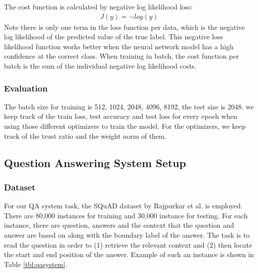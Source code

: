 The cost function is calculated by negative log likelihood loss:
\begin{align*}
    J(y) = -log(y) 
\end{align*}
Note there is only one term in the loss function per data, which is the negative log likelihood of the predicted value of the true label. This negative loss likelihood function works better when the neural network model has a high confidence at the correct class. When training in batch, the cost function per batch is the sum of the individual negative log likelihood costs.

\subsubsection{Evaluation}

The batch size for training is {512, 1024, 2048, 4096, 8192}, the test size is 2048. we keep track of the train loss, test accuracy and test loss for every epoch when using those different optimizers to train the model. For the optimizers, we keep track of the trust ratio and the weight norm of them.


\subsection{Question Answering System Setup}

\subsubsection{Dataset}

For our QA system task, the SQuAD dataset by Rajpurkar et al. \cite{} is employed. There are 80,000 instances for training and 30,000 instance for testing. For each instance, there are question, answers and the context that the question and answer are based on along with the boundary label of the answer. The task is to read the question in order to (1) retrieve the relevant context and (2) then locate the start and end position of the answer. Example of such an instance is shown in Table \ref{tbl:qasystem}. 

